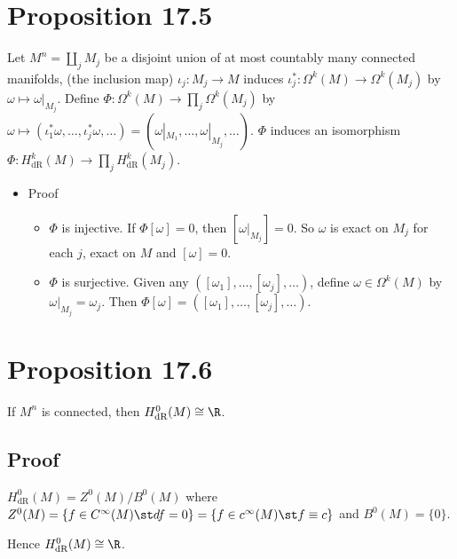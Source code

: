 \documentclass[11pt]{article}
\begin{document}
\section*{Proposition 17.5}
\label{sec:orgad7181b}
Let \(M^{n}=\coprod_{j}M_{j}\) be a disjoint union of at most countably many connected manifolds, (the inclusion map) \(\iota_{j}:M_{j}\to M\) induces \(\iota_{j}^{*}:\Omega^{k}(M)\to\Omega^{k}(M_{j})\) by \(\omega\mapsto\omega|_{M_{j}}\). Define \(\Phi:\Omega^{k}(M)\to\prod_{j}\Omega^{k}(M_{j})\) by \(\omega\mapsto(\iota_{1}^{*}\omega,\ldots,\iota^{*}_{j}\omega,\ldots)=(\omega|_{M_{1}},\ldots,\omega|_{M_{j}},\ldots)\). \(\Phi\) induces an isomorphism \(\Phi:H^{k}_{\text{dR}}(M)\to\prod_{j}H^{k}_{\text{dR}}(M_{j})\).\\
\begin{itemize}
\item Proof\\
\begin{itemize}
\item \(\Phi\) is injective. If \(\Phi[\omega]=0\), then \(\left[ \omega|_{M_{j}} \right]=0\). So \(\omega\) is exact on \(M_{j}\) for each \(j\), exact on \(M\) and \([\omega]=0\).\\
\item \(\Phi\) is surjective. Given any \(([\omega_{1}],\ldots,[\omega_{j}],\ldots)\), define \(\omega\in\Omega^{k}(M)\) by \(\omega|_{M_{j}}=\omega_{j}\). Then \(\Phi[\omega]=([\omega_{1}],\ldots,[\omega_{j}],\ldots)\).\\
\end{itemize}
\end{itemize}
\section*{Proposition 17.6}
\label{sec:org4a23d35}
If \(M^{n}\) is connected, then \(H^{0}_{\text{dR}}(M)\cong\R\).\\
\subsection*{Proof}
\label{sec:orgcdc526d}
\(H^{0}_{\text{dR}}(M)=Z^{0}(M)/B^{0}(M)\) where \(Z^{0}(M)=\{f\in C^{\infty}(M)\st df=0\}=\{f\in c^{\infty}(M)\st f\equiv c\}\) and \(B^{0}(M)=\{0\}\).\\
Hence \(H^{0}_{\text{dR}}(M)\cong\R\).\\
\end{document}
